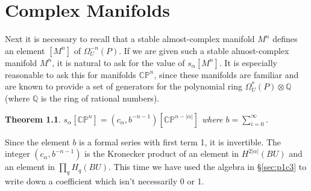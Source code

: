 \documentclass[../main]{subfiles}
\begin{document}
\label{sec:p1c8}

\newtheorem{thm}[equation]{Theorem}

\chapter{Complex Manifolds} %

Next it is necessary to recall that a stable almost-complex manifold $M^n$ defines an element $[M^n]$ of $\Omega^{-n}_U(P)$. If we are given such a stable almost-complex manifold $M^n$, it is natural to ask for the value of $s_\alpha [M^n]$. It is especially reasonable to ask this for manifolds $\mathbb{CP}^n$, since these manifolds are familiar and are known to provide a set of generators for the polynomial ring $\Omega_U^*(P) \otimes \mathbb{Q}$ (where $\mathbb{Q}$ is the ring of rational numbers).
\begin{thm}\label{thm:p1c08.1}
$s_\alpha[\mathbb{CP}^n] = (c_\alpha,b^{-n-1})[\mathbb{CP}^{n-|\alpha|}]$ where $b = \sum_{i=0}^\infty$.
\end{thm}
\begin{explanation}
Since the element $b$ is a formal series with first term 1, it is invertible. The integer $(c_\alpha, b^{-n-1})$ is the Kronecker product of an element in $H^{2|\alpha|}(BU)$ and an element in $\prod_q H_q(BU)$. This time we have used the algebra in \S\ref{sec:p1c3} to write down a coefficient which isn't necessarily 0 or 1.
\end{explanation}
\end{document}
